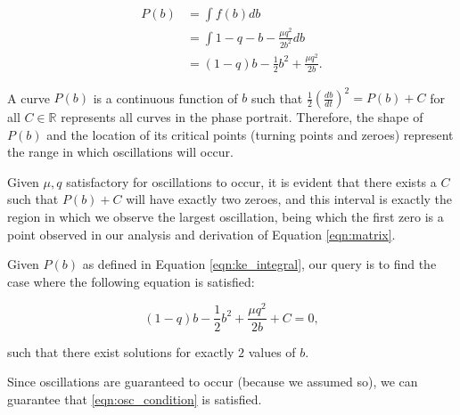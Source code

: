 \documentclass{article}
\begin{document}
\begin{equation}
    \begin{aligned}
        P(b) &= \int f(b) db \\
        &= \int 1 - q - b - \frac{\mu q^2}{2 b^2} db \\
        &= (1-q)b - \frac{1}{2}b^2 + \frac{\mu q^2}{2b}.
    \end{aligned}
    \label{eqn:ke_integral}
\end{equation}

A curve $P(b)$ is a continuous function of $b$ such that $\frac{1}{2}\left(\frac{db}{dt}\right)^2 = P(b) +C$ for all $C \in \mathds{R}$
represents all curves in the phase portrait. Therefore, the shape of $P(b)$ and the location of its critical points (turning points and zeroes)
represent the range in which oscillations will occur.

Given $\mu, q$ satisfactory for oscillations to occur,
it is evident that there exists a $C$ such that $P(b)+C$ will have exactly two zeroes,
and this interval is exactly the region in which we observe the largest oscillation,
being which the first zero is a point observed in our analysis and derivation of Equation \ref{eqn:matrix}.

Given $P(b)$ as defined in Equation \ref{eqn:ke_integral},
our query is to find the case where the following equation is satisfied:

\begin{equation}
    (1-q)b - \frac{1}{2}b^2 + \frac{\mu q^2}{2b} + C = 0,
\end{equation}

such that there exist solutions for exactly $2$ values of $b$.

Since oscillations are guaranteed to occur (because we assumed so),
we can guarantee that \ref{eqn:osc_condition} is satisfied.











\end{document}
